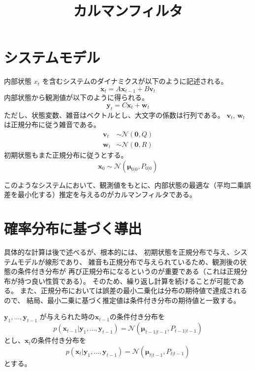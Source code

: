 \documentclass[textwidth-limit=45]{bxjsarticle}
\begin{document}
\title{カルマンフィルタ}
\maketitle

\section{システムモデル}
内部状態 $x_t$ を含むシステムのダイナミクスが以下のように記述される。
\begin{equation}
  \label{sys_update}
  \bm x_t = A \bm x_{t-1} + B \bm v_t
\end{equation}
内部状態から観測値が以下のように得られる。
\begin{equation}
  \label{observation}
  \bm y_t = C \bm x_t + \bm w_t
\end{equation}  
ただし、状態変数、雑音はベクトルとし、大文字の係数は行列である。
$\bm v_t$, $\bm w_t$ は正規分布に従う雑音である。
\begin{align}
  \bm v_t &\sim \mathcal N(\bm 0, Q) \\
  \bm w_t &\sim \mathcal N(\bm 0, R)
\end{align}
初期状態もまた正規分布に従うとする。
\begin{equation}
  \bm x_0 \sim \mathcal N(\bm \mu_{0|0}, P_{0|0})
\end{equation}

このようなシステムにおいて、観測値をもとに、内部状態の最適な（平均二乗誤差を最小化する）推定を与えるのがカルマンフィルタである。

\section{確率分布に基づく導出}
具体的な計算は後で述べるが、根本的には、
初期状態を正規分布で与え、システムモデルが線形であり、
雑音も正規分布で与えられているため、観測後の状態の条件付き分布が
再び正規分布になるというのが重要である（これは正規分布が持つ良い性質である）。
そのため、繰り返し計算を続けることが可能である。
また、正規分布においては誤差の最小二乗化は分布の期待値で達成されるので、
結局、最小二乗に基づく推定値は条件付き分布の期待値と一致する。

$\bm y_1, \dots, \bm y_{t-1}$ が与えられた時の$\bm x_{t-1}$の条件付き分布を
\begin{equation}
  p(\bm x_{t-1}|\bm y_1, \dots, \bm y_{t-1}) = \mathcal N(\bm \mu_{t-1|t-1}, P_{t-1|t-1})
\end{equation}
とし、$\bm x_t$の条件付き分布を
\begin{equation}
  p(\bm x_{t}|\bm y_1, \dots, \bm y_{t-1}) = \mathcal N(\bm \mu_{t|t-1}, P_{t|t-1})
\end{equation}
とする。
\end{document}
